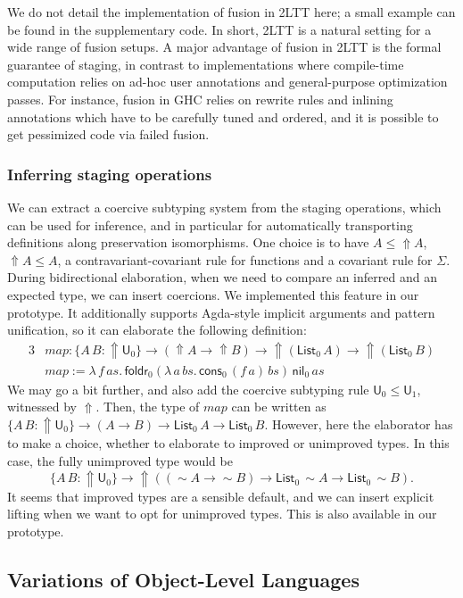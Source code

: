 \documentclass[acmsmall,anonymous,review]{acmart}
\newcommand{\mit}[1]{\mathit{#1}}
\newcommand{\msf}[1]{\mathsf{#1}}
\newcommand{\Lift}{{\Uparrow}}
\newcommand{\spl}{{\sim}}
\renewcommand{\U}{\msf{U}}
\newcommand{\List}{\msf{List}}
\newcommand{\nil}{\msf{nil}}
\newcommand{\cons}{\msf{cons}}
\theoremstyle{remark}
\begin{document}
We do not detail the implementation of fusion in 2LTT here; a small example can
be found in the supplementary code. In short, 2LTT is a natural setting for a
wide range of fusion setups. A major advantage of fusion in 2LTT is the formal
guarantee of staging, in contrast to implementations where compile-time
computation relies on ad-hoc user annotations and general-purpose optimization
passes. For instance, fusion in GHC relies on rewrite rules and inlining
annotations which have to be carefully tuned and ordered, and it is possible to
get pessimized code via failed fusion.

\subsubsection{Inferring staging operations}
We can extract a coercive subtyping system from the staging operations, which
can be used for inference, and in particular for automatically transporting
definitions along preservation isomorphisms. One choice is to have $A \leq \Lift
A$, $\Lift A \leq A$, a contravariant-covariant rule for functions and a
covariant rule for $\Sigma$. During bidirectional elaboration, when we need to
compare an inferred and an expected type, we can insert coercions.  We
implemented this feature in our prototype. It additionally supports Agda-style
implicit arguments and pattern unification, so it can elaborate the following
definition:
\begin{alignat*}{3}
  & \mit{map} : \{A\,B : \Lift\U_0\} \to (\Lift A \to \Lift B)
      \to \Lift(\List_0\,A) \to \Lift(\List_0\,B)\\
  & \mit{map} := \lambda\,f\,\mit{as}.\,
      \msf{foldr}_0
        (\lambda\,a\,\mit{bs}.\, \cons_0\,(f\,a)\,\mit{bs})\,
        \nil_0\,
        as
\end{alignat*}
We may go a bit further, and also add the coercive subtyping rule $\U_0 \leq
\U_1$, witnessed by $\Lift$. Then, the type of $\mit{map}$ can be written as
$\{A\,B : \Lift\U_0\} \to (A \to B) \to \List_0\,A \to \List_0\,B$. However,
here the elaborator has to make a choice, whether to elaborate to improved or
unimproved types. In this case, the fully unimproved type would be
\[ \{A\,B : \Lift\U_0\} \to \Lift((\spl A \to \spl B) \to \List_0\,\spl A \to \List_0\,\spl B). \]
It seems that improved types are a sensible default, and we can insert explicit
lifting when we want to opt for unimproved types. This is also available in our
prototype.

\subsection{Variations of Object-Level Languages}
\label{sec:variations}
\end{document}
